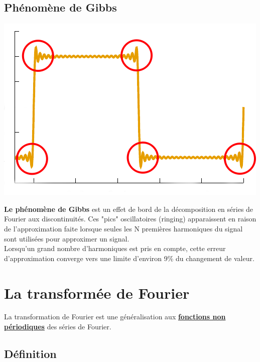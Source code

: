 \subsection*{Phénomène de Gibbs}
\begin{minipage}{0.4\textwidth}
\includegraphics[width=\textwidth]{part02/chap07/gibbs.png}
\end{minipage}
\hfill
\begin{minipage}{0.5\textwidth}
\textbf{Le phénomène de Gibbs} est un effet de bord de la décomposition en séries de Fourier aux discontinuités. Ces "pics" oscillatoires (ringing) apparaissent en raison de l'approximation faite lorsque seules les N premières harmoniques du signal sont utilisées pour approximer un signal.\\

Lorsqu'un grand nombre d'harmoniques est pris en compte, cette erreur d'approximation converge vers une limite d'environ 9\% du changement de valeur.
\end{minipage}

\section{La transformée de Fourier}

La transformation de Fourier est une généralisation aux \textbf{\underline{fonctions non périodiques}} des séries de Fourier.

\subsection*{Définition}

